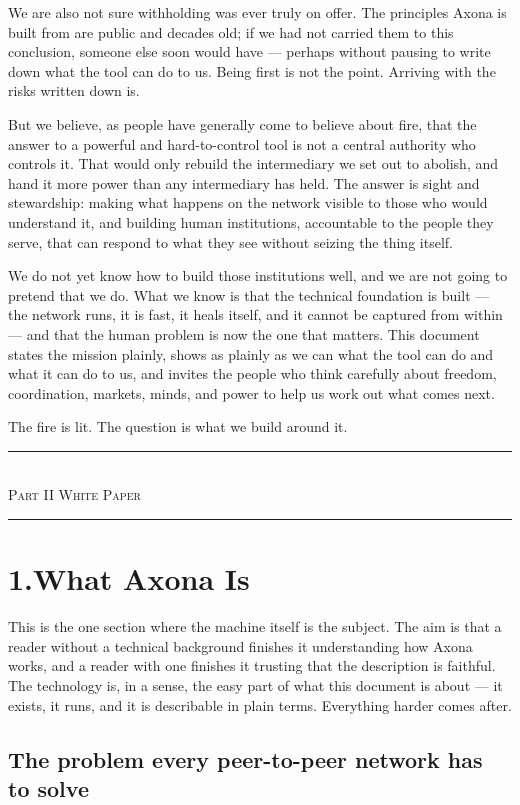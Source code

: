\documentclass[nobib,justified]{tufte-handout}
\newcommand{\manpart}[1]{%
  \needspace{8\baselineskip}%
  \begin{center}%
  \vspace{1.2em}%
  {\color{rust}\rule{3em}{0.8pt}}\\[0.7em]%
  {\scshape\large #1}\\[0.4em]%
  {\color{rust}\rule{3em}{0.8pt}}%
  \vspace{0.9em}%
  \end{center}}
\begin{document}
We are also not sure withholding was ever truly on offer. The principles Axona
is built from are public and decades old; if we had not carried them to this
conclusion, someone else soon would have --- perhaps without pausing to write
down what the tool can do to us. Being first is not the point. Arriving with the risks written down is.

But we believe, as people have generally come to believe about fire, that the
answer to a powerful and hard-to-control tool is not a central authority who
controls it. That would only rebuild the intermediary we set out to abolish,
and hand it more power than any intermediary has held. The answer is sight and
stewardship: making what happens on the network visible to those who would
understand it, and building human institutions, accountable to the people they
serve, that can respond to what they see without seizing the thing itself.

We do not yet know how to build those institutions well, and we are not going
to pretend that we do. What we know is that the technical foundation is built
--- the network runs, it is fast, it heals itself, and it cannot be captured
from within --- and that the human problem is now the one that matters. This
document states the mission plainly, shows as plainly as we can what the tool can do and what it can do to us, and invites the people who think carefully
about freedom, coordination, markets, minds, and power to help us work out what
comes next.

The fire is lit. The question is what we build around it.

\newpage
\manpart{Part II \;\textbullet\; White Paper}

\section{1.\quad What Axona Is}

This is the one section where the machine itself is the subject. The aim is
that a reader without a technical background finishes it understanding how
Axona works, and a reader with one finishes it trusting that the description is
faithful. The technology is, in a sense, the easy part of what this document is
about --- it exists, it runs, and it is describable in plain terms. Everything
harder comes after.

\subsection{The problem every peer-to-peer network has to solve}
\end{document}
